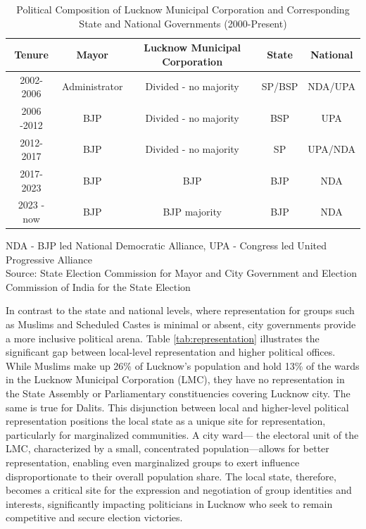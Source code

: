 \begin{table}[ht]
\centering
\caption{Political Composition of Lucknow Municipal Corporation and Corresponding State and National Governments (2000-Present)}
\label{tab:political_composition}
\begin{tabular}{|c|c|c|c|c|}
\hline
\textbf{Tenure} & \textbf{Mayor} & \textbf{Lucknow Municipal Corporation} & \textbf{State} & \textbf{National} \\
\hline
2002-2006 & Administrator & Divided - no majority & SP/BSP & NDA/UPA \\
\hline
2006 -2012 & BJP & Divided - no majority & BSP & UPA \\
\hline
2012-2017 & BJP & Divided - no majority & SP & UPA/NDA \\
\hline
2017-2023 & BJP & BJP & BJP & NDA \\
\hline
2023 - now & BJP & BJP majority & BJP & NDA \\
\hline
\end{tabular}
\raggedright
\small NDA - BJP led National Democratic Alliance, UPA - Congress led United Progressive Alliance\\
\small Source: State Election Commission for Mayor and City Government and Election Commission of India for the State Election
\end{table}

In contrast to the state and national levels, where representation for groups such as Muslims and Scheduled Castes is minimal or absent, city governments provide a more inclusive political arena. Table \ref{tab:representation} illustrates the significant gap between local-level representation and higher political offices. While Muslims make up 26\% of Lucknow's population and hold 13\% of the wards in the Lucknow Municipal Corporation (LMC), they have no representation in the State Assembly or Parliamentary constituencies covering Lucknow city. The same is true for Dalits. This disjunction between local and higher-level political representation positions the local state as a unique site for representation, particularly for marginalized communities. A city ward— the electoral unit of the LMC, characterized by a small, concentrated population—allows for better representation, enabling even marginalized groups to exert influence disproportionate to their overall population share. The local state, therefore, becomes a critical site for the expression and negotiation of group identities and interests, significantly impacting politicians in Lucknow who seek to remain competitive and secure election victories.

